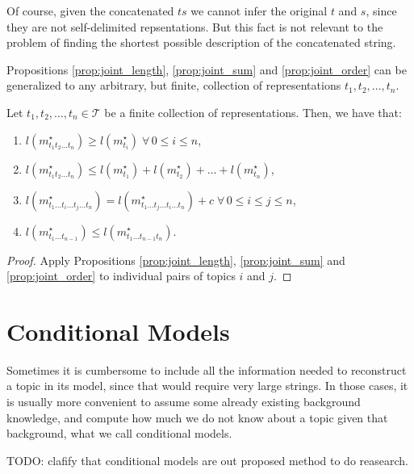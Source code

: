 Of course, given the concatenated $ts$ we cannot infer the original $t$ and $s$, since they are not self-delimited repsentations. But this fact is not relevant to the problem of finding the shortest possible description of the concatenated string.

Propositions \ref{prop:joint_length}, \ref{prop:joint_sum} and \ref{prop:joint_order} can be generalized to any arbitrary, but finite, collection of representations $t_1, t_2, \ldots, t_n$.

\begin{proposition}
\label{prop:joint_multiple_topics}
Let $t_1, t_2, \ldots, t_n \in \mathcal{T}$ be a finite collection of representations. Then, we have that:

\renewcommand{\theenumi}{\roman{enumi}}
\begin{enumerate}
\item $l(m_{t_1 t_2 \ldots t_n}^\star) \geq l(m_ {t_i}^\star) \; \forall \, 0 \leq i \leq n$,
\item $l(m_{t_1 t_2 \ldots t_n}^\star) \leq l(m_ {t_1}^\star) + l(m_ {t_2}^\star) + \ldots + l(m_ {t_n}^\star)$,
\item $l(m_{t_1 \ldots t_i \ldots t_j \ldots t_n}^\star) = l(m_{t_1 \ldots t_j \ldots t_i \ldots t_n}^\star) + c \; \forall \, 0 \leq i \leq j \leq n$,
\item $l(m_{t_1 \ldots t_{n-1}}^\star) \leq l(m_{t_1 \ldots t_{n-1} t_n}^\star)$.
\end{enumerate}
\end{proposition}
\begin{proof}
Apply Propositions \ref{prop:joint_length}, \ref{prop:joint_sum} and \ref{prop:joint_order} to individual pairs of topics $i$ and $j$.
\end{proof}

%
%

\section{Conditional Models}

Sometimes it is cumbersome to include all the information needed to reconstruct a topic in its model, since that would require very large strings. In those cases, it is usually more convenient to assume some already existing background knowledge, and compute how much we do not know about a topic given that background, what we call conditional models.

{\color{red} TODO: clafify that conditional models are out proposed method to do reasearch.}

